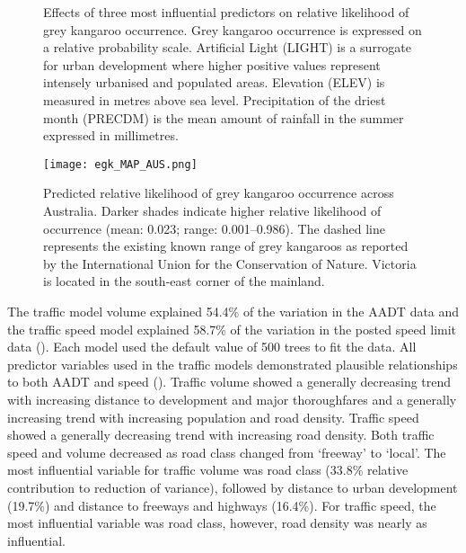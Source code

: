 \begin{figure*}[!h]%
  \centering%
  \caption[Effects of predictor variables on relative likelihood of grey kangaroo occurrence]{Effects of three most influential predictors on relative likelihood of grey kangaroo occurrence. Grey kangaroo occurrence is expressed on a relative probability scale. Artificial Light (LIGHT) is a surrogate for urban development where higher positive values represent intensely urbanised and populated areas. Elevation (ELEV) is measured in metres above sea level. Precipitation of the driest month (PRECDM) is the mean amount of rainfall in the summer expressed in millimetres.}%
  \label{egk_sdm_vars}
\end{figure*}

\begin{figure*}[!b]
  \centering
  \texttt{[image: egk\_MAP\_AUS.png]}
  \caption[Predicted relative likelihood of grey kangaroo occurrence across Australia]{Predicted relative likelihood of grey kangaroo occurrence across Australia. Darker shades indicate higher relative likelihood of occurrence (mean: 0.023; range: 0.001--0.986). The dashed line represents the existing known range of grey kangaroos as reported by the International Union for the Conservation of Nature. Victoria is located in the south-east corner of the mainland.}
  \label{egk_map_aus}
\end{figure*}

The traffic model volume explained 54.4\% of the variation in the AADT data and the traffic speed model explained 58.7\% of the variation in the posted speed limit data ().  Each model used the default value of 500 trees to fit the data.  All predictor variables used in the traffic models demonstrated plausible relationships to both AADT and speed (). Traffic volume showed a generally decreasing trend with increasing distance to development and major thoroughfares and a generally increasing trend with increasing population and road density. Traffic speed showed a generally decreasing trend with increasing road density. Both traffic speed and volume decreased as road class changed from `freeway' to `local'. The most influential variable for traffic volume was road class (33.8\% relative contribution to reduction of variance), followed by distance to urban development (19.7\%) and distance to freeways and highways (16.4\%). For traffic speed, the most influential variable was road class, however, road density was nearly as influential.

